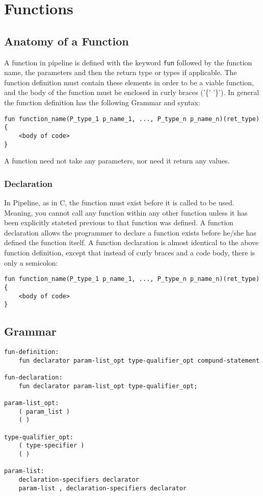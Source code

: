 \documentclass[./LRM_main.tex]{subfiles}
\begin{document}


\chapter{Functions}
\section{Anatomy of a Function}
A function in pipeline is defined with the keyword \texttt{fun} followed by the function name, the parameters and then the return type or types if applicable. The function definition must contain these elements in order to be a viable function, and the body of the function must be enclosed in curly braces ('\{' '\}'). In general the function definition has the following Grammar and syntax:\\
\begin{lstlisting}
fun function_name(P_type_1 p_name_1, ..., P_type_n p_name_n)(ret_type)
{
	<body of code>
}
\end{lstlisting}
A function need not take any parameters, nor need it return any values.
\subsection{Declaration}
In Pipeline, as in C, the function must exist before it is called to be used. Meaning, you cannot call any function within any other function unless it has been explicitly stateted previous to that function was defined. A function declaration allows the programmer to declare a function exists before he/she has defined the function itself. A function declaration is almost identical to the above function definition, except that instead of curly braces and a code body, there is only a semicolon:
\begin{lstlisting}
fun function_name(P_type_1 p_name_1, ..., P_type_n p_name_n)(ret_type)
{
	<body of code>
}
\end{lstlisting}
\section{Grammar}
\begin{lstlisting}
fun-definition:
	fun declarator param-list_opt type-qualifier_opt compund-statement

fun-declaration:
	fun declarator param-list_opt type-qualifier_opt;

param-list_opt:
	( param_list )
	( )

type-qualifier_opt:
	( type-specifier )
	( )

param-list:
	declaration-specifiers declarator
	param-list , declaration-specifiers declarator


\end{lstlisting}
\end{document}
